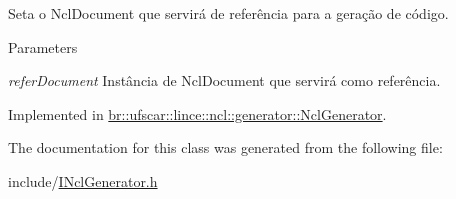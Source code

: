 Seta o NclDocument que servirá de referência para a geração de código. 


\begin{DoxyParams}{Parameters}
\item[{\em referDocument}]Instância de NclDocument que servirá como referência. \end{DoxyParams}


Implemented in \hyperlink{classbr_1_1ufscar_1_1lince_1_1ncl_1_1generator_1_1NclGenerator_aad4936354267258229fb526a070e5482}{br::ufscar::lince::ncl::generator::NclGenerator}.



The documentation for this class was generated from the following file:\begin{DoxyCompactItemize}
\item 
include/\hyperlink{INclGenerator_8h}{INclGenerator.h}\end{DoxyCompactItemize}
